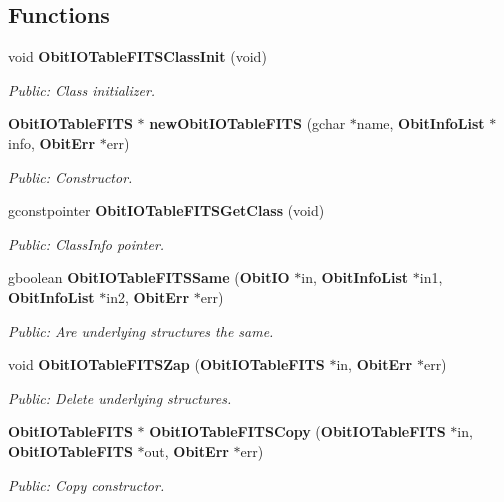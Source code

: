 \subsection*{Functions}
\begin{CompactItemize}
\item 
void {\bf Obit\-IOTable\-FITSClass\-Init} (void)
\begin{CompactList}\small\item\em Public: Class initializer. \item\end{CompactList}\item 
{\bf Obit\-IOTable\-FITS} $\ast$ {\bf new\-Obit\-IOTable\-FITS} (gchar $\ast$name, {\bf Obit\-Info\-List} $\ast$info, {\bf Obit\-Err} $\ast$err)
\begin{CompactList}\small\item\em Public: Constructor. \item\end{CompactList}\item 
gconstpointer {\bf Obit\-IOTable\-FITSGet\-Class} (void)
\begin{CompactList}\small\item\em Public: Class\-Info pointer. \item\end{CompactList}\item 
gboolean {\bf Obit\-IOTable\-FITSSame} ({\bf Obit\-IO} $\ast$in, {\bf Obit\-Info\-List} $\ast$in1, {\bf Obit\-Info\-List} $\ast$in2, {\bf Obit\-Err} $\ast$err)
\begin{CompactList}\small\item\em Public: Are underlying structures the same. \item\end{CompactList}\item 
void {\bf Obit\-IOTable\-FITSZap} ({\bf Obit\-IOTable\-FITS} $\ast$in, {\bf Obit\-Err} $\ast$err)
\begin{CompactList}\small\item\em Public: Delete underlying structures. \item\end{CompactList}\item 
{\bf Obit\-IOTable\-FITS} $\ast$ {\bf Obit\-IOTable\-FITSCopy} ({\bf Obit\-IOTable\-FITS} $\ast$in, {\bf Obit\-IOTable\-FITS} $\ast$out, {\bf Obit\-Err} $\ast$err)
\begin{CompactList}\small\item\em Public: Copy constructor. \item\end{CompactList}\item 

\end{CompactItemize}
